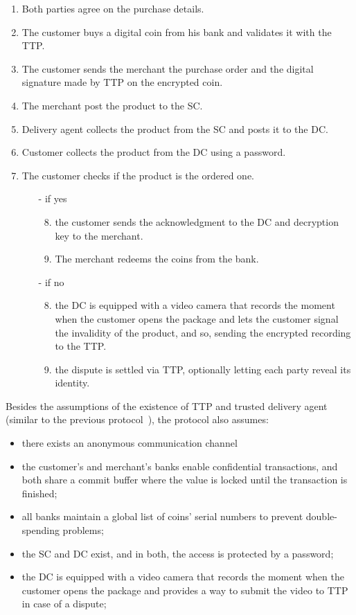 \begin{enumerate}
    \item Both parties agree on the purchase details.
    \item The customer buys a digital coin from his bank and validates it with the TTP.
    \item The customer sends the merchant the purchase order and the digital signature made by TTP on the encrypted coin.
    \item The merchant post the product to the SC.
    \item Delivery agent collects the product from the SC and posts it to the DC.
    \item Customer collects the product from the DC using a password.
    \item The customer checks if the product is the ordered one.
    \begin{itemize}
    \item[-] if yes 
        \begin{enumerate}
        \setcounter{enumii}{7}
        \item the customer sends the acknowledgment to the DC and decryption key to the merchant.
        \item The merchant redeems the coins from the bank.
        \end{enumerate}
    \item[-] if no
        \begin{enumerate}
        \setcounter{enumii}{7}
        \item the DC is equipped with a video camera that records the moment when the customer opens the package and lets the customer signal the invalidity of the product, and so, sending the encrypted recording to the TTP. 
        \item the dispute is settled via TTP, optionally letting each party reveal its identity.
    \end{enumerate}
    \end{itemize}
\end{enumerate}
\endgroup

Besides the assumptions of the existence of TTP and trusted delivery agent (similar to the previous protocol~\cite{mohammedalarajFairnessPhysicalProducts2012}), the protocol also assumes:

\begin{itemize}
    \item there exists an anonymous communication channel 
    \item the customer's and merchant's banks enable confidential transactions, and both share a commit buffer where the value is locked until the transaction is finished;
    \item all banks maintain a global list of coins' serial numbers to prevent double-spending problems;
    \item the SC and DC exist, and in both, the access is protected by a password;
    \item the DC is equipped with a video camera that records the moment when the customer opens the package and provides a way to submit the video to TTP in case of a dispute;
\end{itemize}


